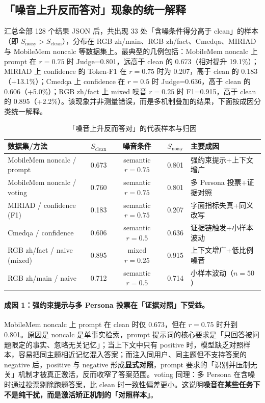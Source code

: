 \documentclass[UTF8,zihao=-4]{ctexart}
\begin{document}
\subsection{「噪音上升反而答对」现象的统一解释}
\label{sec:noise_up_acc_up}

汇总全部 128 个结果 JSON 后，共出现 33 处「含噪条件得分高于 clean」的样本（即 $S_{\text{noisy}} > S_{\text{clean}}$），分布在 RGB zh/main、RGB zh/fact、Cmedqa、MIRIAD 与 MobileMem noncalc 等数据集上。最典型的几例包括：MobileMem noncalc 上 prompt 在 $r=0.75$ 时 Judge=0.801，远高于 clean 的 0.673（相对提升 19.1\%）；MIRIAD 上 confidence 的 Token-F1 在 $r=0.75$ 时为 0.207，高于 clean 的 0.183（+13.1\%）；Cmedqa 上 confidence 在 $r=0.5$ 时 Judge=0.636，高于 clean 的 0.606（+5.0\%）；RGB zh/fact 上 mixed 噪音 $r=0.25$ 时 F1=0.915，高于 clean 的 0.895（+2.2\%）。该现象并非测量错误，而是多机制叠加的结果，下面按成因分类统一解释。

\begin{table}[H]
  \centering
  \caption{「噪音上升反而答对」的代表样本与归因}
  \label{tab:noise_up_acc_up}
  \small
  \begin{tabularx}{\textwidth}{lcccl}
    \toprule
    数据集/方法 & $S_{\text{clean}}$ & 噪音条件 & $S_{\text{noisy}}$ & 主要成因 \\
    \midrule
    MobileMem noncalc / prompt & 0.673 & semantic $r=0.75$ & 0.801 & 强约束提示+上下文增广 \\
    MobileMem noncalc / voting & 0.760 & semantic $r=0.75$ & 0.801 & 多 Persona 投票+证据对照 \\
    MIRIAD / confidence (F1) & 0.183 & semantic $r=0.75$ & 0.207 & 字面指标失真+同义改写 \\
    Cmedqa / confidence & 0.606 & semantic $r=0.5$ & 0.636 & 证据链触发+小样本波动 \\
    RGB zh/fact / naive (mixed) & 0.895 & mixed $r=0.25$ & 0.915 & 上下文增广+低比例噪音 \\
    RGB zh/main / naive & 0.712 & semantic $r=0.5$ & 0.714 & 小样本波动（$n=50$） \\
    \bottomrule
  \end{tabularx}
\end{table}

\paragraph{成因 1：强约束提示与多 Persona 投票在「证据对照」下受益。}
MobileMem noncalc 上 prompt 在 clean 时仅 0.673，但在 $r=0.75$ 时升到 0.801。原因是 noncalc 是单事实检索，prompt 提示词的核心要求是「只回答被问题限定的事实、忽略无关记忆」；当上下文中只有 positive 时，模型缺乏对照样本，容易把同主题相近记忆混入答案；而注入同用户、同主题但不支持答案的 negative 后，positive 与 negative 形成\textbf{显式对照}，prompt 要求的「识别并压制无关」机制才被真正激活，反而收窄了答案范围。voting 同理：多 Persona 在含噪时通过投票剔除跑题答案，比 clean 时一致性偏差更小。这说明\textbf{噪音在某些任务下不是纯干扰，而是激活矫正机制的「对照样本」}。
\end{document}
